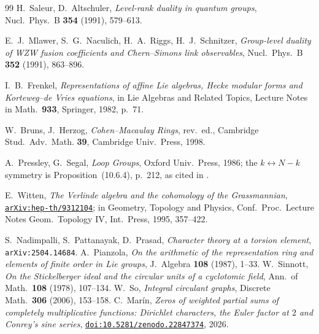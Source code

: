 \documentclass[11pt,a4paper]{article}
\theoremstyle{definition}
\begin{document}
\begin{thebibliography}{99}
 H.~Saleur, D.~Altschuler, \emph{Level-rank duality in quantum groups},
Nucl.~Phys.~B \textbf{354} (1991), 579--613.

 E.~J.~Mlawer, S.~G.~Naculich, H.~A.~Riggs, H.~J.~Schnitzer, \emph{Group-level
duality of WZW fusion coefficients and Chern--Simons link observables}, Nucl.~Phys.~B \textbf{352}
(1991), 863--896.

 I.~B.~Frenkel, \emph{Representations of affine Lie algebras, Hecke modular forms and
Korteweg--de Vries equations}, in Lie Algebras and Related Topics, Lecture Notes in
Math.~\textbf{933}, Springer, 1982, p.~71.

 W.~Bruns, J.~Herzog, \emph{Cohen--Macaulay Rings}, rev.~ed., Cambridge Stud.~Adv.~Math.
\textbf{39}, Cambridge Univ.~Press, 1998.

 A.~Pressley, G.~Segal, \emph{Loop Groups}, Oxford Univ.~Press, 1986; the
$k\leftrightarrow N-k$ symmetry is Proposition~(10.6.4), p.~212, as cited in \cite{Wit93}.

 E.~Witten, \emph{The Verlinde algebra and the cohomology of the Grassmannian},
\href{https://arxiv.org/abs/hep-th/9312104}{\texttt{arXiv:hep-th/9312104}}; in Geometry, Topology
and Physics, Conf.~Proc.~Lecture Notes Geom.~Topology IV, Int.~Press, 1995, 357--422.

 S.~Nadimpalli, S.~Pattanayak, D.~Prasad, \emph{Character theory at a torsion element},
\texttt{arXiv:2504.14684}.
 A.~Pianzola, \emph{On the arithmetic of the representation ring and elements of
finite order in Lie groups}, J.~Algebra \textbf{108} (1987), 1--33.
 W.~Sinnott, \emph{On the Stickelberger ideal and the circular units of a cyclotomic
field}, Ann.~of Math.~\textbf{108} (1978), 107--134.
 W.~So, \emph{Integral circulant graphs}, Discrete Math.~\textbf{306} (2006), 153--158.
 C.~Mar\'in, \emph{Zeros of weighted partial sums of completely multiplicative
functions: Dirichlet characters, the Euler factor at $2$ and Conrey's sine series},
\href{https://doi.org/10.5281/zenodo.22847374}{\texttt{doi:10.5281/zenodo.22847374}}, 2026.

\end{thebibliography}
\end{document}
